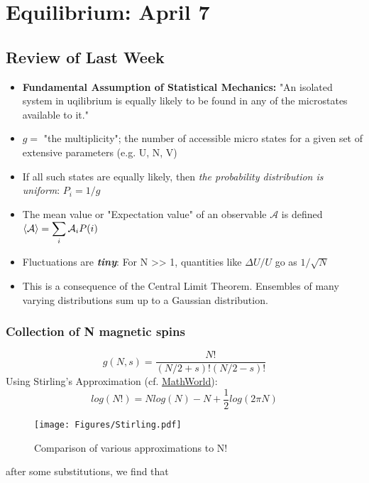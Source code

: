 \section{Equilibrium: April 7}

\subsection{Review of Last Week}
\begin{itemize}
\item \textbf{Fundamental Assumption of Statistical Mechanics:} "An isolated system in uqilibrium is equally likely to be found in any of the microstates available to it."

\item $g =$ "the multiplicity"; the number of accessible micro states for a given set of extensive parameters (e.g. U, N, V)

\item If all such states are equally likely, then \textit{the probability distribution is uniform}: $P_i = 1/g$

\item The mean value or "Expectation value" of an observable $\mathcal{A}$ is defined 
  $\Braket{\mathcal{A}} = \displaystyle \sum_{i} \mathcal{A}_i P(i)$

\item Fluctuations are \textit{\textbf{tiny}}: For N >> 1, quantities like $\Delta U/U$ go as $1/\sqrt{N}$

\item This is a consequence of the Central Limit Theorem. Ensembles of many varying distributions sum up to a Gaussian distribution.

\end{itemize}

\subsubsection{Collection of N magnetic spins}
\begin{equation}
g(N,s) = \frac{N!}{(N/2 + s)! (N/2-s)!}
\end{equation}
Using Stirling's Approximation (cf. \href{http://mathworld.wolfram.com/StirlingsApproximation.html}{MathWorld}):
\begin{equation}
log(N!) = N log(N) - N + \frac{1}{2}log(2 \pi N)
\end{equation}
\begin{figure}[h]
\centering
\texttt{[image: Figures/Stirling.pdf]}
\caption{Comparison of various approximations to N!}
\end{figure}
after some substitutions, we find that

